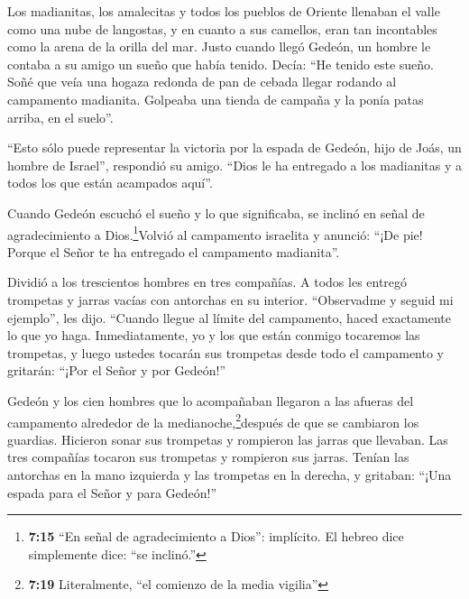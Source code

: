  Los madianitas, los amalecitas y todos los pueblos de
Oriente llenaban el valle como una nube de langostas, y en cuanto a sus
camellos, eran tan incontables como la arena de la orilla del mar.
 Justo cuando llegó Gedeón, un hombre le contaba a su amigo
un sueño que había tenido. Decía: ``He tenido este sueño. Soñé que veía
una hogaza redonda de pan de cebada llegar rodando al campamento
madianita. Golpeaba una tienda de campaña y la ponía patas arriba, en el
suelo''.

 ``Esto sólo puede representar la victoria por la espada de
Gedeón, hijo de Joás, un hombre de Israel'', respondió su amigo. ``Dios
le ha entregado a los madianitas y a todos los que están acampados
aquí''.

 Cuando Gedeón escuchó el sueño y lo que significaba, se
inclinó en señal de agradecimiento a Dios.\footnote{\textbf{7:15} ``En
  señal de agradecimiento a Dios'': implícito. El hebreo dice
  simplemente dice: ``se inclinó.''}Volvió al campamento israelita y
anunció: ``¡De pie! Porque el Señor te ha entregado el campamento
madianita''.

 Dividió a los trescientos hombres en tres compañías. A
todos les entregó trompetas y jarras vacías con antorchas en su
interior.  ``Observadme y seguid mi ejemplo'', les dijo.
``Cuando llegue al límite del campamento, haced exactamente lo que yo
haga.  Inmediatamente, yo y los que están conmigo tocaremos
las trompetas, y luego ustedes tocarán sus trompetas desde todo el
campamento y gritarán: ``¡Por el Señor y por Gedeón!''

 Gedeón y los cien hombres que lo acompañaban llegaron a
las afueras del campamento alrededor de la medianoche,\footnote{\textbf{7:19}
  Literalmente, ``el comienzo de la media vigilia''}después de que se
cambiaron los guardias. Hicieron sonar sus trompetas y rompieron las
jarras que llevaban.  Las tres compañías tocaron sus
trompetas y rompieron sus jarras. Tenían las antorchas en la mano
izquierda y las trompetas en la derecha, y gritaban: ``¡Una espada para
el Señor y para Gedeón!''

